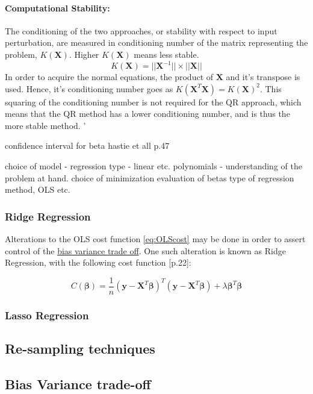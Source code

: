 \documentclass[%
oneside,                 %
final,                   %
10pt]{article}
\begin{document}
\paragraph*{Computational Stability:}
The conditioning of the two approaches, or stability with respect to input perturbation, are measured in conditioning number of the matrix representing the problem, $K(\bm{X})$. Higher $K(\bm{X})$ means less stable. 
\begin{equation}
K(\bm{X})=||\bm{X}^{-1}|| \times ||\bm{X}||
\end{equation}
In order to acquire the normal equations, the product of $\bm{X}$ and it's transpose is used. Hence, it's conditioning number goes as $K(\bm{X}^T\bm{X})=K(\bm{X})^2$. This squaring of the conditioning number is not required for the QR approach, which means that the QR method has a lower conditioning number, and is thus the more stable method.
'

confidence interval for beta hastie et all p.47

choice of model - regression type - linear etc. polynomials - understanding of the problem at hand.
choice of minimization evaluation of betas type of regression method, OLS etc.
\subsubsection{Ridge Regression}
Alterations to the OLS cost function \eqref{eq:OLScost} may be done in order to assert control of the  \hyperref[S:M_Biasvar]{bias variance trade off}. One such alteration is known as Ridge Regression, with the following cost function \citep{MehtaPankaj2019Ahli}[p.22]:

\begin{equation}
C(\bm{\beta})=\frac{1}{n}(\bm{y}-\bm{X}^T\bm{\beta})^T(\bm{y}-\bm{X}^T\bm{\beta})+\lambda \bm{\beta}^T\bm{\beta}
\label{eq:RIDGEcost}
\end{equation}


\subsubsection{Lasso Regression}
\subsection{Re-sampling techniques}
\subsection{Bias Variance trade-off} \label{S:M_Biasvar}
\end{document}
